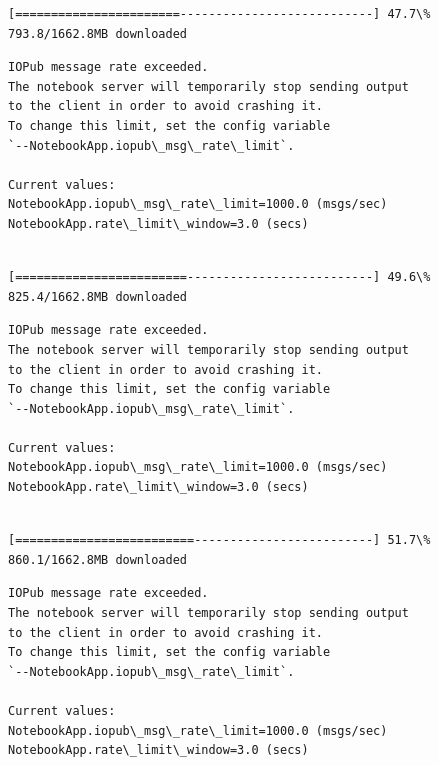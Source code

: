 \documentclass[11pt]{article}
\begin{document}
    \begin{Verbatim}[commandchars=\\\{\}]
[=======================---------------------------] 47.7\% 793.8/1662.8MB downloaded
    \end{Verbatim}

    \begin{Verbatim}[commandchars=\\\{\}]
IOPub message rate exceeded.
The notebook server will temporarily stop sending output
to the client in order to avoid crashing it.
To change this limit, set the config variable
`--NotebookApp.iopub\_msg\_rate\_limit`.

Current values:
NotebookApp.iopub\_msg\_rate\_limit=1000.0 (msgs/sec)
NotebookApp.rate\_limit\_window=3.0 (secs)


    \end{Verbatim}

    \begin{Verbatim}[commandchars=\\\{\}]
[========================--------------------------] 49.6\% 825.4/1662.8MB downloaded
    \end{Verbatim}

    \begin{Verbatim}[commandchars=\\\{\}]
IOPub message rate exceeded.
The notebook server will temporarily stop sending output
to the client in order to avoid crashing it.
To change this limit, set the config variable
`--NotebookApp.iopub\_msg\_rate\_limit`.

Current values:
NotebookApp.iopub\_msg\_rate\_limit=1000.0 (msgs/sec)
NotebookApp.rate\_limit\_window=3.0 (secs)


    \end{Verbatim}

    \begin{Verbatim}[commandchars=\\\{\}]
[=========================-------------------------] 51.7\% 860.1/1662.8MB downloaded
    \end{Verbatim}

    \begin{Verbatim}[commandchars=\\\{\}]
IOPub message rate exceeded.
The notebook server will temporarily stop sending output
to the client in order to avoid crashing it.
To change this limit, set the config variable
`--NotebookApp.iopub\_msg\_rate\_limit`.

Current values:
NotebookApp.iopub\_msg\_rate\_limit=1000.0 (msgs/sec)
NotebookApp.rate\_limit\_window=3.0 (secs)


    \end{Verbatim}
\end{document}
